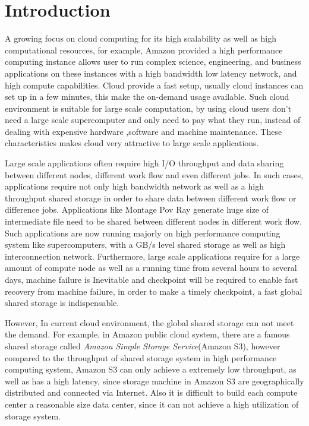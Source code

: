 \section{Introduction}
\label{sec:introduction}
A growing focus on cloud computing for its high scalability as well as high computational
resources, for example, Amazon provided a high performance computing instance allows user to run
complex science, engineering, and business applications on these instances with a high bandwidth low latency
network, and high compute capabilities.
Cloud provide a fast setup, usually cloud instances can set up in a few minutes, this
make the on-demand usage available.
Such cloud environment is suitable for large scale
computation, by using cloud users don't need a large scale supercomputer and only need to pay
what they run, instead of dealing with expensive hardware ,software and machine maintenance.
These characteristics makes cloud very attractive to large scale applications.

Large scale applications often require high I/O
throughput and data sharing between different nodes, different work flow and even different jobs.
In such cases, applications require not only high bandwidth network as well as a high throughput
shared storage in order to share data between different work flow or difference jobs.
Applications like Montage\cite{montage} Pov Ray\cite{povray} generate huge size of intermediate file
need to be shared between different nodes in different work flow.
Such applications are now running majorly on high performance computing system like supercomputers,
with a GB/s level shared storage as well as high interconnection network.
Furthermore, large scale applications require for a large amount of compute node as well as a
running time from several hours to several days, machine failure is Inevitable and checkpoint will be required to enable
fast recovery from machine failure\cite{checkpointing}, in order to make a timely checkpoint, a
fast global shared storage is indispensable.

However, In current cloud environment, the global shared storage can not meet the demand.
For example, in Amazon public cloud system, there are a famous shared storage called \emph{Amazon
Simple Storage Service}(Amazon S3), however compared to the throughput of shared storage system in
high performance computing system, Amazon S3 can only achieve a extremely low throughput,
as well as has a high latency, since storage machine in Amazon S3 are geographically distributed and connected via Internet.
Also it is difficult to build each compute center a reasonable size data center, since it can not
achieve a high utilization of storage system.

